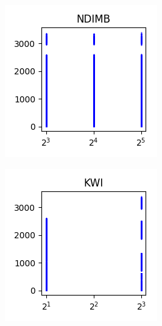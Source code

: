 \documentclass[sigconf,authorversion]{acmart}
\begin{document}
\begin{figure}[hbtp]\ContinuedFloat
    \centering
    \begin{subfigure}[b]{0.3\textwidth}
        \includegraphics[width=\textwidth]{img/NDIMB.png}
        \label{fig:ndimb}
    \end{subfigure}
    \begin{subfigure}[b]{0.3\textwidth}
        \includegraphics[width=\textwidth]{img/KWI.png}

\end{subfigure}
\end{figure}
\end{document}
